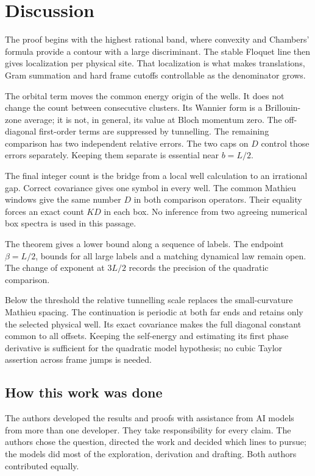 \section{Discussion}\label{sec:discussion}
The proof begins with the highest rational band, where convexity and Chambers' formula provide a contour with a large discriminant. The stable Floquet line then gives localization per physical site. That localization is what makes translations, Gram summation and hard frame cutoffs controllable as the denominator grows.

The orbital term moves the common energy origin of the wells. It does not change the count between consecutive clusters. Its Wannier form is a Brillouin-zone average; it is not, in general, its value at Bloch momentum zero. The off-diagonal first-order terms are suppressed by tunnelling. The remaining comparison has two independent relative errors. The two caps on $D$ control those errors separately. Keeping them separate is essential near $b=L/2$.

The final integer count is the bridge from a local well calculation to an irrational gap. Correct covariance gives one symbol in every well. The common Mathieu windows give the same number $D$ in both comparison operators. Their equality forces an exact count $KD$ in each box. No inference from two agreeing numerical box spectra is used in this passage.

The theorem gives a lower bound along a sequence of labels. The endpoint $\beta=L/2$, bounds for all large labels and a matching dynamical law remain open. The change of exponent at $3L/2$ records the precision of the quadratic comparison.

Below the threshold the relative tunnelling scale replaces the small-curvature Mathieu spacing. The continuation is periodic at both far ends and retains only the selected physical well. Its exact covariance makes the full diagonal constant common to all offsets. Keeping the self-energy and estimating its first phase derivative is sufficient for the quadratic model hypothesis; no cubic Taylor assertion across frame jumps is needed.

\subsection*{How this work was done}
The authors developed the results and proofs with assistance from AI models from more than one developer. They take responsibility for every claim. The authors chose the question, directed the work and decided which lines to pursue; the models did most of the exploration, derivation and drafting. Both authors contributed equally.

